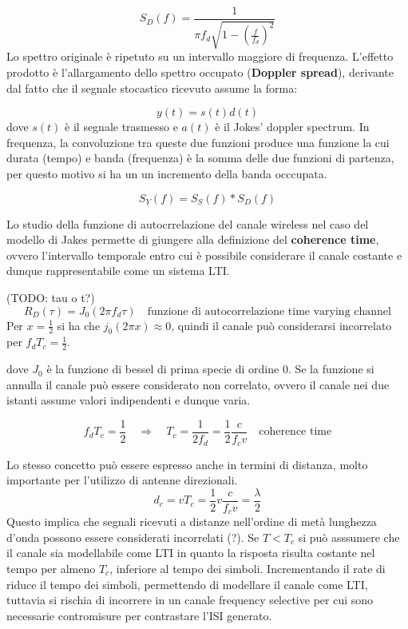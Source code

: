 \[
    S_D(f) = \frac{1}{\pi f_d \sqrt{1 - \left(\frac{f}{f_d}\right)^2}}
\]
Lo spettro originale è ripetuto su un intervallo maggiore di frequenza. L'effetto prodotto è l'allargamento dello spettro occupato (\textbf{Doppler spread}), derivante dal fatto che il segnale stocastico ricevuto assume la forma:

\[
    y(t) = s(t) d(t)
\]
dove $s(t)$ è il segnale trasmesso e $a(t)$ è il Jokes' doppler spectrum. In frequenza, la convoluzione tra queste due funzioni produce una funzione la cui durata (tempo) e banda (frequenza) è la somma delle due funzioni di partenza, per questo motivo si ha un un incremento della banda occcupata.

\[
    S_Y(f) = S_S(f) \ast S_D(f)
\]

Lo studio della funzione di autocrrelazione del canale wireless nel caso del modello di Jakes permette di giungere alla definizione del \textbf{coherence time}, ovvero l'intervallo temporale entro cui è possibile considerare il canale costante e dunque rappresentabile come un sistema LTI.


(TODO: tau o t?)
\[
    R_D (\tau) = J_0(2\pi f_d \tau) \quad \text{funzione di autocorrelazione time varying channel}
\]
Per $x=\frac{1}{2}$ si ha che $j_0(2\pi x) \approx 0$, quindi il canale può considerarsi incorrelato per $f_d T_c = \frac{1}{2}$.

dove $J_0$ è la funzione di bessel di prima specie di ordine 0.  Se la funzione si annulla il canale può essere considerato non correlato, ovvero il canale nei due istanti assume valori indipendenti e dunque varia.

\[
    f_d T_c = \frac{1}{2} \quad \Rightarrow \quad  T_c = \frac{1}{2 f_d} = \frac{1}{2} \frac{c}{f_c v} \quad \text{coherence time}
\]

Lo stesso concetto può essere espresso anche in termini di distanza, molto importante per l'utilizzo di antenne direzionali.
\[
    d_c = v T_c = \frac{1}{2} v \frac{c}{f_c v} = \frac{\lambda}{2}
\]
Questo implica che segnali ricevuti a distanze nell'ordine di metà lunghezza d'onda possono essere considerati incorrelati (?).
Se $T < T_c$ si può asssumere che il canale sia modellabile come LTI in quanto la risposta risulta costante nel tempo per almeno $T_c$, inferiore al tempo dei simboli.
Incrementando il rate di riduce il tempo dei simboli, permettendo di modellare il canale come LTI, tuttavia si rischia di incorrere in un canale frequency selective per cui sono necessarie contromisure per contrastare l'ISI generato.




